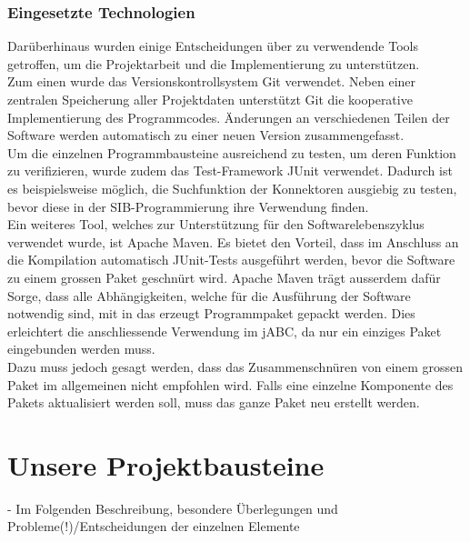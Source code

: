 \subsubsection{Eingesetzte Technologien}
Darüberhinaus wurden einige Entscheidungen über zu verwendende Tools getroffen, um die Projektarbeit und die Implementierung zu unterstützen.\\

Zum einen wurde das Versionskontrollsystem Git verwendet. Neben einer zentralen Speicherung aller Projektdaten unterstützt Git die kooperative Implementierung des Programmcodes. Änderungen an verschiedenen Teilen der Software werden automatisch zu einer neuen Version zusammengefasst.\\

Um die einzelnen Programmbausteine ausreichend zu testen, um deren Funktion zu verifizieren, wurde zudem das Test-Framework JUnit verwendet. Dadurch ist es beispielsweise möglich, die Suchfunktion der Konnektoren ausgiebig zu testen, bevor diese in der SIB-Programmierung ihre Verwendung finden.\\

Ein weiteres Tool, welches zur Unterstützung für den Softwarelebenszyklus verwendet wurde, ist Apache Maven. Es bietet den Vorteil, dass im Anschluss an die Kompilation automatisch JUnit-Tests ausgeführt werden, bevor die Software zu einem grossen Paket geschnürt wird. Apache Maven trägt ausserdem dafür Sorge, dass alle Abhängigkeiten, welche für die Ausführung der Software notwendig sind, mit in das erzeugt Programmpaket gepackt werden. Dies erleichtert die anschliessende Verwendung im jABC, da nur ein einziges Paket eingebunden werden muss.\\

Dazu muss jedoch gesagt werden, dass das Zusammenschnüren von einem grossen Paket im allgemeinen nicht empfohlen wird. Falls eine einzelne Komponente des Pakets aktualisiert werden soll, muss das ganze Paket neu erstellt werden. 

\section{Unsere Projektbausteine}
 - Im Folgenden Beschreibung, besondere Überlegungen und Probleme(!)/Entscheidungen der einzelnen Elemente

